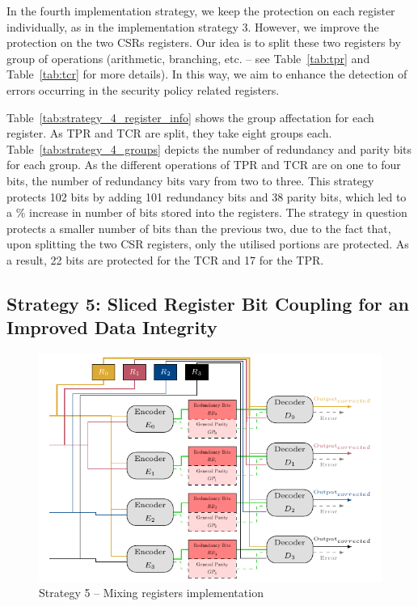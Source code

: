 In the fourth implementation strategy, we keep the protection on each register individually, as in the implementation strategy 3. However, we improve the protection on the two CSRs registers. Our idea is to split these two registers by group of operations (arithmetic, branching, etc. -- see Table~\ref{tab:tpr} and Table~\ref{tab:tcr} for more details). In this way, we aim to enhance the detection of errors occurring in the security policy related registers.

Table~\ref{tab:strategy_4_register_info} shows the group affectation for each register. As TPR and TCR are split, they take eight groups each.
Table~\ref{tab:strategy_4_groups} depicts the number of redundancy and parity bits for each group. As the different operations of TPR and TCR are on one to four bits, the number of redundancy bits vary from two to three. This strategy protects 102 bits by adding 101 redundancy bits and 38 parity bits, which led to a \% increase in number of bits stored into the registers. The strategy in question protects a smaller number of bits than the previous two, due to the fact that, upon splitting the two CSR registers, only the utilised portions are protected. As a result, 22 bits are protected for the TCR and 17 for the TPR.

\subsection{Strategy 5: Sliced Register Bit Coupling for an Improved Data Integrity}

\begin{figure}[ht]
    \centering
    \includegraphics[page=1]{c6_group_composition/img/implem5_spaghetti.pdf}
    \caption{Strategy 5 -- Mixing registers implementation}
    \label{fig:strategy_5_functionning}
\end{figure}

